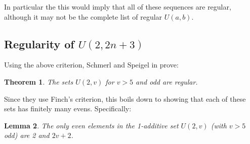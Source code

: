 \documentclass{report}
\newtheorem{theorem}{Theorem}[section]
\newtheorem{lemma}[theorem]{Lemma}
\theoremstyle{remark}
\numberwithin{equation}{section}
\begin{document}
In particular the this would imply that all of these sequences are
regular, although it may not be the complete list of regular $U(a,b)$.

\subsection{Regularity of $U(2,2n+3)$}

Using the above criterion, Schmerl and Speigel in
\cite{schmerl:jct1994} prove:

\begin{theorem}
  The sets $U(2,v)$ for $v > 5$ and odd are regular.
\end{theorem}

Since they use Finch's criterion, this boils down to showing that each
of these sets has finitely many evens.  Specifically: 

\begin{lemma}The only even elements in the 1-additive set $U(2,v)$
  (with $v > 5$ odd) are 2 and $2v+2$.
\end{lemma}
\end{document}
